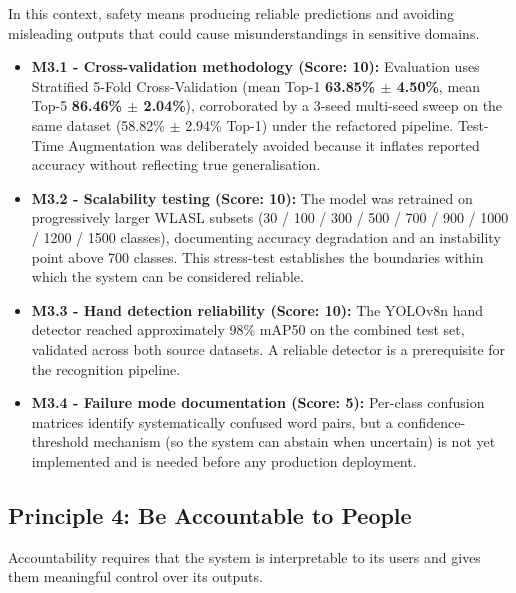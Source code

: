 In this context, safety means producing reliable predictions and avoiding misleading outputs that
could cause misunderstandings in sensitive domains.

\begin{itemize}
    \item \textbf{M3.1 - Cross-validation methodology (Score: 10):} Evaluation uses Stratified 5-Fold Cross-Validation (mean Top-1 \textbf{63.85\% $\pm$ 4.50\%}, mean Top-5 \textbf{86.46\% $\pm$ 2.04\%}), corroborated by a 3-seed multi-seed sweep on the same dataset (58.82\% $\pm$ 2.94\% Top-1) under the refactored pipeline. Test-Time Augmentation was deliberately avoided because it inflates reported accuracy without reflecting true generalisation.
    \item \textbf{M3.2 - Scalability testing (Score: 10):} The model was retrained on progressively larger WLASL subsets (30 / 100 / 300 / 500 / 700 / 900 / 1000 / 1200 / 1500 classes), documenting accuracy degradation and an instability point above 700 classes. This stress-test establishes the boundaries within which the system can be considered reliable.
    \item \textbf{M3.3 - Hand detection reliability (Score: 10):} The YOLOv8n hand detector reached approximately 98\% mAP50 on the combined test set, validated across both source datasets. A reliable detector is a prerequisite for the recognition pipeline.
    \item \textbf{M3.4 - Failure mode documentation (Score: 5):} Per-class confusion matrices identify systematically confused word pairs, but a confidence-threshold mechanism (so the system can abstain when uncertain) is not yet implemented and is needed before any production deployment.
\end{itemize}

\subsection{Principle 4: Be Accountable to People}

Accountability requires that the system is interpretable to its users and gives them meaningful
control over its outputs.

